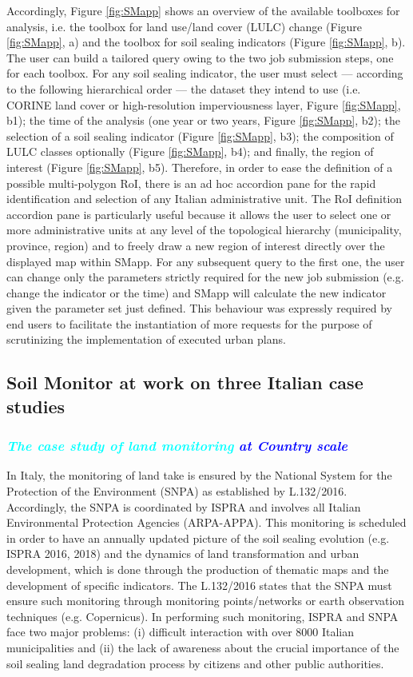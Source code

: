 \documentclass[APA,LATO1COL,doublespace]{WileyNJD-v2}
\newcommand{\reviewer}[1]{\emph{\textcolor{cyan}{#1}}}   %
\newcommand{\update}[1]{\emph{\textcolor{blue}{#1}}}     %
\begin{document}
Accordingly, Figure \ref{fig:SMapp} shows an overview of the available toolboxes for analysis, i.e. the toolbox for land use/land cover (LULC) change (Figure \ref{fig:SMapp}, a) and the toolbox for soil sealing indicators (Figure \ref{fig:SMapp}, b).
The user can build a tailored query owing to the two job submission steps, one for each toolbox. 
For any soil sealing indicator, the user must select --- according to the following hierarchical order --- the dataset they intend to use (i.e. CORINE land cover or high-resolution imperviousness layer, Figure \ref{fig:SMapp}, b1); the time of the analysis (one year or two years, Figure \ref{fig:SMapp}, b2); the selection of a soil sealing indicator (Figure \ref{fig:SMapp}, b3); the composition of LULC classes optionally (Figure \ref{fig:SMapp}, b4); and finally, the region of interest (Figure \ref{fig:SMapp}, b5). Therefore, in order to ease the definition of a possible multi-polygon RoI, there is an ad hoc accordion pane for the rapid identification and selection of any Italian administrative unit.
The RoI definition accordion pane is particularly useful because it allows the user to select one or more administrative units at any level of the topological hierarchy (municipality, province, region) and to freely draw a new region of interest directly over the displayed map within SMapp.
For any subsequent query to the first one, the user can change only the parameters strictly required for the new job submission (e.g. change the indicator or the time) and SMapp will calculate the new indicator given the parameter set just defined. 
This behaviour was expressly required by end users to facilitate the instantiation of more requests for the purpose of scrutinizing the implementation of executed urban plans.

\subsection{Soil Monitor at work on three Italian case studies }
\subsubsection{\reviewer{The case study of land monitoring} \update{at Country scale} }
In Italy, the monitoring of land take is ensured by the National System for the Protection of the Environment (SNPA) as established by L.132/2016.
Accordingly, the SNPA is coordinated by ISPRA and involves all Italian Environmental Protection Agencies (ARPA-APPA). 
This monitoring is scheduled in order to have an annually updated picture of the soil sealing evolution (e.g. ISPRA 2016, 2018) and the dynamics of land transformation and urban development, which is done through the production of thematic maps and the development of specific indicators. 
The L.132/2016 states that the SNPA must ensure such monitoring through monitoring points/networks or earth observation techniques (e.g. Copernicus).
In performing such monitoring, ISPRA and SNPA face two major problems: (i) difficult interaction with over 8000 Italian municipalities and (ii) the lack of awareness about the crucial importance of the soil sealing land degradation process by citizens and other public authorities.
\end{document}
